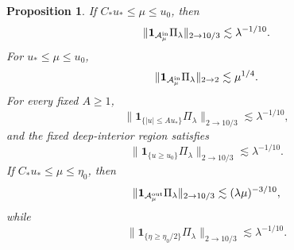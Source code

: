 \documentclass[11pt,a4paper]{amsart}
\newtheorem{proposition}[theorem]{Proposition}
\numberwithin{equation}{section}
\newcommand{\one}{\mathbf 1}
\newcommand{\norm}[1]{\lVert #1\rVert}
\begin{document}
\begin{proposition}
If \(C_*u_*\le\mu\le u_0\), then
\begin{equation}\label{eq:package-allowed}
 \norm{\one_{\mathcal A_\mu^{\rm in}}\Pi_\lambda}_{2\to10/3}
 \lesssim\lambda^{-1/10}.
\end{equation}
For \(u_*\le\mu\le u_0\),
\begin{equation}\label{eq:package-inner-L2}
 \norm{\one_{\mathcal A_\mu^{\rm in}}\Pi_\lambda}_{2\to2}
 \lesssim\mu^{1/4}.
\end{equation}
For every fixed \(A\ge1\),
\begin{equation}\label{eq:package-core}
 \norm{\one_{\{|u|\le Au_*\}}\Pi_\lambda}_{2\to10/3}
 \lesssim\lambda^{-1/10},
\end{equation}
and the fixed deep-interior region satisfies
\begin{equation}\label{eq:package-deep}
 \norm{\one_{\{u\ge u_0\}}\Pi_\lambda}_{2\to10/3}
 \lesssim\lambda^{-1/10}.
\end{equation}
If \(C_*u_*\le\mu\le\eta_0\), then
\begin{equation}\label{eq:package-outer}
 \norm{\one_{\mathcal A_\mu^{\rm out}}\Pi_\lambda}_{2\to10/3}
 \lesssim(\lambda\mu)^{-3/10},
\end{equation}
while
\begin{equation}\label{eq:package-far-outer}
 \norm{\one_{\{\eta\ge\eta_0/2\}}\Pi_\lambda}_{2\to10/3}
 \lesssim\lambda^{-1/10}.
\end{equation}
\end{proposition}
\end{document}
